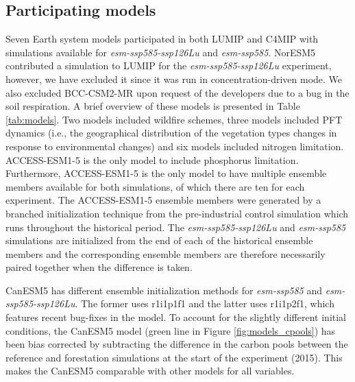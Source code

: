\documentclass[draft]{agujournal2019}
\begin{document}
\subsection{Participating models}

Seven Earth system models participated in both LUMIP and C4MIP with simulations available for \textit{esm-ssp585-ssp126Lu} and \textit{esm-ssp585}.
NorESM5 contributed a simulation to LUMIP for the \textit{esm-ssp585-ssp126Lu} experiment, however, we have excluded it since it was run in concentration-driven mode.
We also excluded BCC-CSM2-MR upon request of the developers due to a bug in the soil respiration.
A brief overview of these models is presented in Table \ref{tab:models}.
Two models included wildfire schemes, three models included PFT dynamics (i.e., the geographical distribution of the vegetation types changes in response to environmental changes) and six models included nitrogen limitation.
ACCESS-ESM1-5 is the only model to include phosphorus limitation.
Furthermore, ACCESS-ESM1-5 is the only model to have multiple ensemble members available for both simulations, of which there are ten for each experiment.
The ACCESS-ESM1-5 ensemble members were generated by a branched initialization technique from the pre-industrial control simulation which runs throughout the historical period.
The \textit{esm-ssp585-ssp126Lu} and \textit{esm-ssp585} simulations are initialized from the end of each of the historical ensemble members and the corresponding ensemble members are therefore necessarily paired together when the difference is taken.

CanESM5 has different ensemble initialization methods for \textit{esm-ssp585} and \textit{esm-ssp585-ssp126Lu}.
The former uses r1i1p1f1 and the latter uses r1i1p2f1, which features recent bug-fixes in the model.
To account for the slightly different initial conditions, the CanESM5 model (green line in Figure \ref{fig:models_cpools}) has been bias corrected by subtracting the difference in the carbon pools between the reference and forestation simulations at the start of the experiment (2015).
This makes the CanESM5 comparable with other models for all variables.

\end{document}
